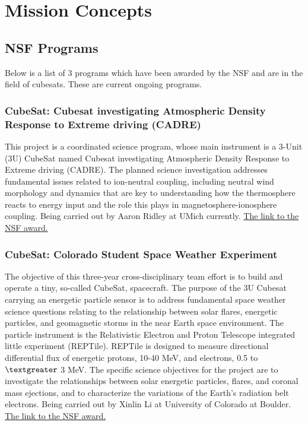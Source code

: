 %

\section{Mission Concepts}

\subsection{NSF Programs}
Below is a list of 3 programs which have been awarded by the NSF and are in the field of cubesats. These are current ongoing programs. 

\subsubsection{CubeSat: Cubesat investigating Atmospheric Density Response to Extreme driving (CADRE)}
This project is a coordinated science program, whose main instrument is a 3-Unit (3U) CubeSat named Cubesat investigating Atmospheric Density Response to Extreme driving (CADRE). The planned science investigation addresses fundamental issues related to ion-neutral coupling, including neutral wind morphology and dynamics that are key to understanding how the thermosphere reacts to energy input and the role this plays in magnetosphere-ionosphere coupling. Being carried out by Aaron Ridley at UMich currently. \href{http://nsf.gov/awardsearch/showAward?AWD_ID=1042815&HistoricalAwards=false}{The link to the NSF award.}

\subsubsection{CubeSat: Colorado Student Space Weather Experiment}

The objective of this three-year cross-disciplinary team effort is to build and operate a tiny, so-called CubeSat, spacecraft. The purpose of the 3U Cubesat carrying an energetic particle sensor is to address fundamental space weather science questions relating to the relationship between solar flares, energetic particles, and geomagnetic storms in the near Earth space environment. The particle instrument is the Relativistic Electron and Proton Telescope integrated little experiment (REPTile). REPTile is designed to measure directional differential flux of energetic protons, 10-40 MeV, and electrons, 0.5 to $\textgreater$ 3 MeV.  The specific science objectives for the project are to investigate the relationships between solar energetic particles, flares, and coronal mass ejections, and to characterize the variations of the Earth's radiation belt electrons. Being carried out by Xinlin Li at University of Colorado at Boulder. \href{http://nsf.gov/awardsearch/showAward?AWD_ID=1042815&HistoricalAwards=false}{The link to the NSF award.}

